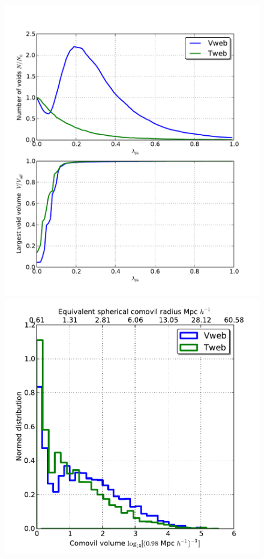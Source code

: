 \documentclass[usenatbib]{latex/mn2e}
\begin{document}
\begin{flushleft}
\begin{figure}
\begin{center}

  \includegraphics[trim = 5mm 10mm 15mm 18mm, clip, keepaspectratio=true,
  width=0.35\textheight]{./figures/voids_regions_percolation.pdf}

  \includegraphics[trim = 0mm 00mm 00mm 00mm, clip, keepaspectratio=true,
  width=0.35\textheight]{./figures/voids_regions_volume.pdf}


\end{center}
\end{figure}
\end{flushleft}
\end{document}
